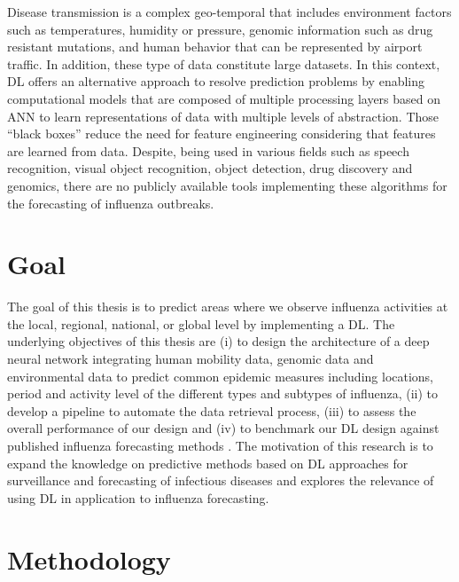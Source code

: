\documentclass[12pt]{article}
\begin{document}
 Disease transmission is a complex geo-temporal that includes environment factors\autocite{Pica2012} such as temperatures, humidity or pressure, genomic information such as drug resistant mutations, and human behavior that can be represented by airport traffic. In addition, these type of data constitute large datasets. In this context, DL offers an alternative approach to resolve prediction problems by enabling computational models that are composed of multiple processing layers based on ANN to learn representations of data with multiple levels of abstraction. Those ``black boxes'' reduce the need for feature engineering considering that features are learned from data. Despite, being used in various fields such as speech recognition, visual object recognition, object detection, drug discovery and genomics, there are no publicly available tools implementing these algorithms for the forecasting of influenza outbreaks.

\section{Goal}

The goal of this thesis is to predict areas where we observe influenza activities at the local, regional, national, or global level by implementing a DL. The underlying objectives of this thesis are (i) to design the architecture of a deep neural network integrating human mobility data, genomic data and environmental data to predict common epidemic measures \autocite{nsoesie2014} including locations,  period and activity level of the different types and subtypes of influenza,  (ii) to develop a pipeline to automate the data retrieval process, (iii) to assess the overall performance of our design and (iv) to benchmark our DL design against published influenza forecasting methods . The motivation of this research is to expand the knowledge on predictive methods based on DL approaches for surveillance and forecasting of infectious diseases and explores the relevance of using DL in application to influenza forecasting. 

\section{Methodology}
\end{document}

